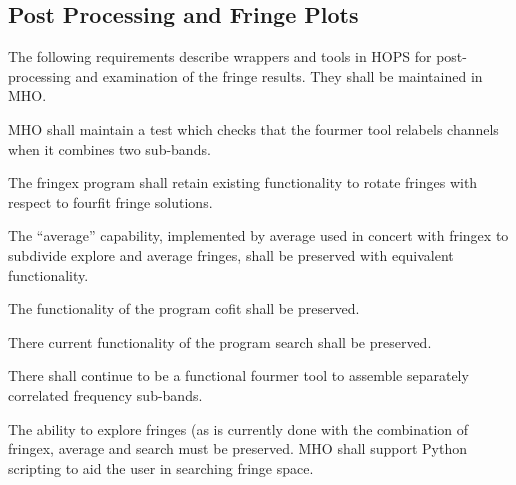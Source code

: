 
\subsection{Post Processing and Fringe Plots}
\label{sec:postprocreq}

The following requirements describe wrappers and tools in HOPS for
post-processing and examination of the fringe results. They shall be
maintained in MHO.


\begin{description}
 \acs{MHO} shall maintain a test which checks that the \acs{fourmer}
tool relabels channels when it combines two sub-bands.

 The \acs{fringex} program shall retain existing functionality to rotate
fringes with respect to fourfit fringe solutions.

 The ``average'' capability, implemented by \acs{average}
      used in concert with \acs{fringex} to subdivide explore and average
      fringes, shall be preserved with equivalent functionality.

 The functionality of the program \acs{cofit} shall be preserved.

 There current functionality of the program \acs{search} shall be preserved.

 There shall continue to be a functional \acs{fourmer} tool
      to assemble separately correlated frequency sub-bands.

 The ability to explore fringes (as is currently done with
    the combination of \acs{fringex}, \acs{average} and search must be
    preserved.  MHO shall support \acs{Python} scripting to aid the user
    in searching fringe space.


\end{description}
